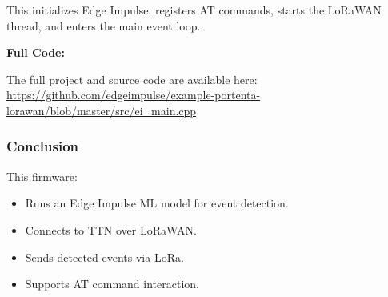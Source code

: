 This initializes Edge Impulse, registers AT commands, starts the LoRaWAN thread, and enters the main event loop. \cite{edge_impulse_portenta_lorawan:2025}

\textbf{Full Code:}

\begin{code}
	The full project and source code are available here:  
	\url{https://github.com/edgeimpulse/example-portenta-lorawan/blob/master/src/ei_main.cpp}
\end{code}

\subsubsection{Conclusion}

This firmware:
\begin{itemize}
	\item Runs an Edge Impulse ML model for event detection.
	\item Connects to TTN over LoRaWAN.
	\item Sends detected events via LoRa.
	\item Supports AT command interaction. \cite{edge_impulse_portenta_lorawan:2025}
\end{itemize}






